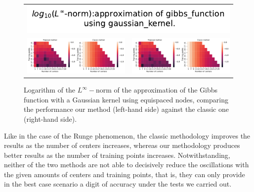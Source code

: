 \documentclass[12pt]{report} %
\begin{document}
\begin{figure}[h]
  \begin{tabular}{cc}
    \multicolumn{2}{c}{{\includegraphics[width=.5\textwidth]
    {imagenes/experiments/1d/variational/linf_gibbs_function_gaussian_kernel_Methods_Title.pdf}}}                                                                                       \\
    {\includegraphics[height=.4\textwidth, trim={0 0 11.5cm 0},clip=true]
    {imagenes/experiments/1d/variational/linf_gibbs_function_gaussian_kernel_Methods_Comparison.pdf}}  &
     {\includegraphics[height=.4\textwidth, trim={9.5cm 0 0 0},clip=true]{imagenes/experiments/1d/variational/linf_gibbs_function_gaussian_kernel_Methods_Comparison.pdf}} \\
  \end{tabular}
  \caption{Logarithm of the $L^\infty-$norm of the approximation of the Gibbs function with a Gaussian kernel using equispaced nodes, comparing the performance our method (left-hand side) against the classic one (right-hand side).}
  \label{fig:gibbs-gaussian-kernel-comparison-classic}
\end{figure}

Like
in the case of the Runge phenomenon, the classic methodology improves
the results as the number of centers increases, whereas our methodology
produces better results as the number of training points increases.
Notwithstanding, neither of the two methods are not able to decisively reduce the oscillations with the given amounts of centers and training points, that is, they can only provide in the best case scenario a digit of accuracy under the tests we carried out.
\end{document}
